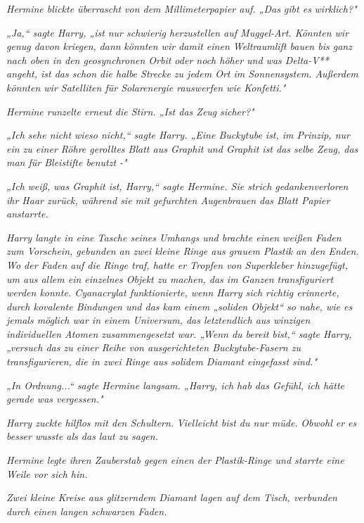 {\emph{Hermine blickte überrascht von dem Millimeterpapier auf. „Das gibt es} \emph{\emph{wirklich?}"}

\emph{„Ja,“ sagte Harry, „ist} \emph{nur schwierig herzustellen auf Muggel-Art. Könnten wir genug davon kriegen,} \emph{dann} \emph{könnten wir damit einen Weltraumlift bauen bis ganz nach oben in den geosynchronen Orbit oder noch höher und was Delta-V** angeht, ist das schon die halbe Strecke zu jedem Ort im Sonnensystem. Außerdem könnten wir Satelliten für Solarenergie rauswerfen wie Konfetti."}

\emph{Hermine runzelte erneut die Stirn. „Ist das Zeug} \emph{\emph{sicher?}"}

\emph{„Ich sehe nicht wieso nicht,“ sagte Harry. „Eine Buckytube ist, im Prinzip, nur ein zu einer Röhre gerolltes Blatt aus Graphit und Graphit ist das selbe Zeug, das man für Bleistifte benutzt -"}

\emph{„Ich} \emph{\emph{weiß,}} \emph{was Graphit ist, Harry,“ sagte Hermine. Sie strich gedankenverloren ihr Haar zurück, während sie mit gefurchten Augenbrauen das Blatt Papier anstarrte.}

\emph{Harry langte in eine Tasche seines Umhangs und brachte einen weißen Faden zum Vorschein, gebunden an zwei kleine Ringe aus grauem Plastik} \emph{an den Enden. Wo der Faden auf die Ringe traf, hatte er Tropfen von Superkleber hinzugefügt, um aus allem ein einzelnes Objekt zu machen, das im Ganzen transfiguriert werden konnte. Cyanacrylat funktionierte, wenn Harry sich richtig erinnerte, durch kovalente Bindungen und das kam einem „soliden Objekt“ so nahe, wie es jemals möglich war in einem Universum, das letztendlich aus winzigen individuellen Atomen zusammengesetzt war. „Wenn du bereit bist,“ sagte Harry, „versuch das zu einer Reihe von ausgerichteten Buckytube-Fasern zu transfigurieren, die in zwei Ringe aus solidem Diamant eingefasst sind."}

\emph{„In Ordnung...“ sagte Hermine langsam. „Harry, ich hab das Gefühl, ich hätte gerade was vergessen."}

\emph{Harry zuckte hilflos mit den Schultern.} \emph{\emph{Vielleicht bist du nur müde.}} \emph{Obwohl er es besser wusste als das laut zu sagen.}

\emph{Hermine legte ihren Zauberstab gegen einen der Plastik-Ringe und starrte eine Weile vor sich hin.}

\emph{Zwei kleine Kreise aus glitzerndem Diamant lagen auf dem Tisch, verbunden durch einen langen schwarzen Faden.}

}
